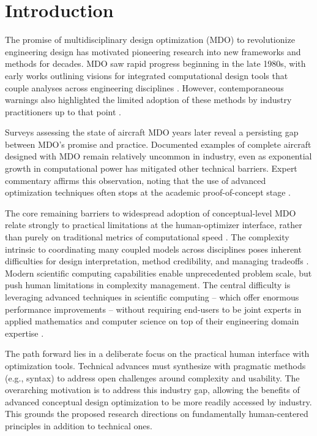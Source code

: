 \chapter{Introduction}
\label{chap:intro}

The promise of multidisciplinary design optimization (MDO) to revolutionize engineering design has motivated pioneering research into new frameworks and methods for decades. MDO saw rapid progress beginning in the late 1980s, with early works outlining visions for integrated computational design tools that couple analyses across engineering disciplines \cite{ashley_making_1982, vanderplaats_automated_1976, haftka_multidisciplinary_1997}. However, contemporaneous warnings also highlighted the limited adoption of these methods by industry practitioners up to that point \cite{kroo_multidisciplinary_1997, drela_pros_1998}.

Surveys assessing the state of aircraft MDO years later reveal a persisting gap between MDO’s promise and practice. Documented examples of complete aircraft designed with MDO remain relatively uncommon in industry, even as exponential growth in computational power has mitigated other technical barriers. Expert commentary affirms this observation, noting that the use of advanced optimization techniques often stops at the academic proof-of-concept stage \cite{mcmasters_airplane_2002, kroo_multidisciplinary_1997, agte_mdo_2010, ashley_making_1982, haftka_multidisciplinary_1997,gazaix_industrialization_2017}.

The core remaining barriers to widespread adoption of conceptual-level MDO relate strongly to practical limitations at the human-optimizer interface, rather than purely on traditional metrics of computational speed \cite{gpkit}. The complexity intrinsic to coordinating many coupled models across disciplines poses inherent difficulties for design interpretation, method credibility, and managing tradeoffs \cite{salas_framework_1998}. Modern scientific computing capabilities enable unprecedented problem scale, but push human limitations in complexity management. The central difficulty is leveraging advanced techniques in scientific computing -- which offer enormous performance improvements -- without requiring end-users to be joint experts in applied mathematics and computer science on top of their engineering domain expertise \cite{ma_modelingtoolkit_2021}.

The path forward lies in a deliberate focus on the practical human interface with optimization tools. Technical advances must synthesize with pragmatic methods (e.g., syntax) to address open challenges around complexity and usability. The overarching motivation is to address this industry gap, allowing the benefits of advanced conceptual design optimization to be more readily accessed by industry. This grounds the proposed research directions on fundamentally human-centered principles in addition to technical ones.

